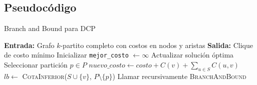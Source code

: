 \documentclass[letterpaper, 12pt]{report}
\begin{document}
\subsection{Pseudocódigo}
\begin{algorithm}[H]
\caption{Branch and Bound para DCP}
\begin{algorithmic}[1]
\State \textbf{Entrada:} Grafo $k$-partito completo con costos en nodos y aristas
\State \textbf{Salida:} Clique de costo mínimo
\State Inicializar \texttt{mejor\_costo} $\leftarrow \infty$
            \State Actualizar solución óptima
        \EndIf
        \Return
    \EndIf
    \State Seleccionar partición $p \in P$
        \State $nuevo\_costo \leftarrow costo + C(v) + \sum_{u \in S}C(u,v)$
        \State $lb \leftarrow$ \textsc{CotaInferior}($S \cup \{v\}$, $P \setminus \{p\}$)
            \State Llamar recursivamente \textsc{BranchAndBound}
        \EndIf
    \EndFor
\EndProcedure
\end{algorithmic}
\end{algorithm}



\end{document}
